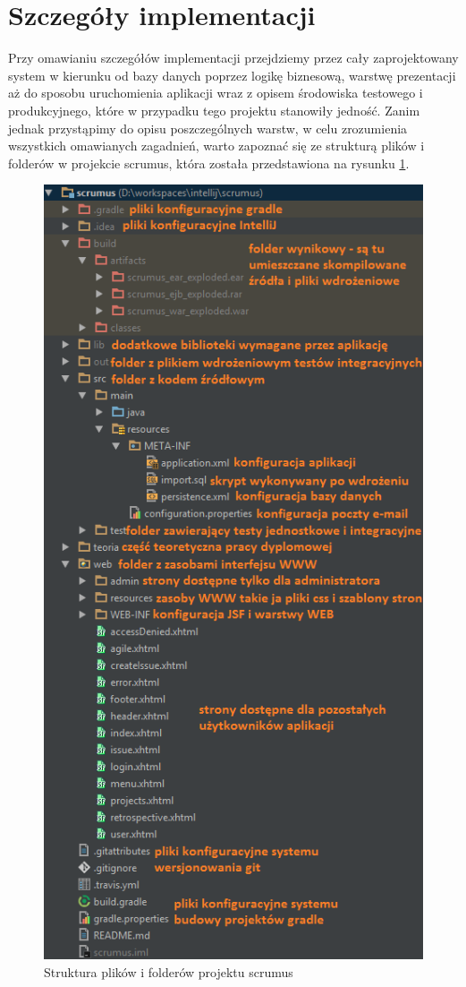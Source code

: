 \section{Szczegóły implementacji}
Przy omawianiu szczegółów implementacji przejdziemy przez cały zaprojektowany system w kierunku od bazy danych poprzez logikę biznesową, warstwę prezentacji aż do sposobu uruchomienia aplikacji wraz z opisem środowiska testowego i produkcyjnego, które w przypadku tego projektu stanowiły jedność. Zanim jednak przystąpimy do opisu poszczególnych warstw, w celu zrozumienia wszystkich omawianych zagadnień, warto zapoznać się ze strukturą plików i folderów w projekcie scrumus, która została przedstawiona na rysunku \ref{fig:struktura_intellij}.

\begin{figure}[tp]
	\centering
	\includegraphics[width=12cm]{rysunki/struktura_intellij.png}	
	\caption{Struktura plików i folderów projektu scrumus}
	\label{fig:struktura_intellij}
\end{figure}

